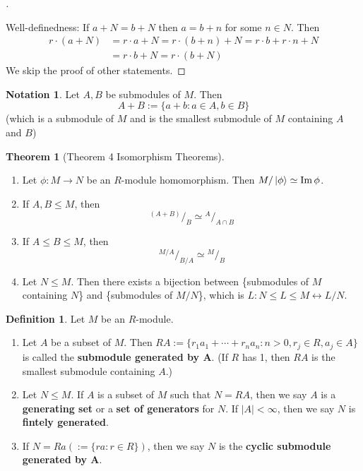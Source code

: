 \documentclass{article}
\theoremstyle{definition}
\newtheorem{thm}{Theorem}
\newtheorem{dfn}{Definition}
\newtheorem*{ntn}{Notation}
\newenvironment{proofs}[1][\proofname]{%
  \begin{proof}[#1]$ $\par\nobreak\ignorespaces
}{%
  \end{proof}
}
\newenvironment{thms}[1][\proofname]{%
  \begin{thm}[#1]$ $\par\nobreak\ignorespaces
}{%
  \end{thm}
}
\newcommand*\quot[2]{{^{\textstyle #1}\big/_{\textstyle #2}}}
\newcommand{\lra}{\leftrightarrow}
\begin{document}
\begin{proofs}
	Well-definedness:
	If $a + N = b + N$ then $a = b + n$ for some $n \in N$.
	Then
	\[
		\begin{split}
			r \cdot (a + N) &= r \cdot a + N = r \cdot (b + n) + N = r \cdot b + r \cdot n + N\\
			&= r \cdot b + N = r \cdot (b + N)
		\end{split}
	\]
	We skip the proof of other statements.
\end{proofs}

\begin{ntn}
	Let $A, B$ be submodules of $M$.
	Then 
	\[
		A + B:= \{a + b: a \in A, b \in B\}
	\]
	(which is a submodule of $M$ and is the smallest submodule of $M$ containing $A$ and $B$)
\end{ntn}

\begin{thms}[Theorem 4 Isomorphism Theorems]
	\begin{enumerate}
		\item[(1)] Let $\phi: M \to N$ be an $R$-module homomorphism.
			Then $M/\ket \phi \simeq \Im \phi$.

		\item[(2)] If $A, B \leq M$, then
			\[
				\quot{(A + B)}{B} \simeq \quot{A}{A \cap B}
			\]

		\item[(3)] If $A \leq B \leq M$, then
			\[
				\quot{M/A}{B/A} \simeq \quot{M}{B}
			\]

		\item[(4)] Let $N \leq M$.
			Then there exists a bijection between \{submodules of $M$ containing $N$\} and \{submodules of $M/N$\}, which is $L: N \leq L \leq M \lra L/N$.
	\end{enumerate}
\end{thms}

\begin{dfn}
	Let $M$ be an $R$-module.

	\begin{enumerate}
		\item[(1)] Let $A$ be a subset of $M$.
			Then $RA := \{r_1 a_1 + \cdots + r_n a_n: n > 0, r_j \in R, a_j \in A\}$ is called the \textbf{submodule generated by $\bm{A}$}.
			(If $R$ has 1, then $RA$ is the smallest submodule containing $A$.)

		\item[(2)] Let $N \leq M$.
			If $A$ is a subset of $M$ such that $N = RA$, then we say $A$ is a \textbf{generating set} or a \textbf{set of generators} for $N$.
			If $|A| < \infty$, then we say $N$ is \textbf{fintely generated}.

		\item[(3)] If $N = Ra (:= \{ra: r \in R\})$, then we say $N$ is the \textbf{cyclic submodule generated by $\bm{A}$}.
	\end{enumerate}
\end{dfn}
\end{document}
